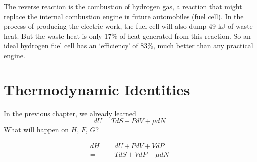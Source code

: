 The reverse reaction is the combustion of hydrogen gas, a reaction that might replace the internal combustion engine in future automobiles (fuel cell).
In the process of producing the electric work, the fuel cell will also dump 49 kJ of waste heat.
But the waste heat is only 17\% of heat generated from this reaction. So an ideal hydrogen fuel cell has an `efficiency' of 83\%, much better than any practical engine.




\section{Thermodynamic Identities}
In the previous chapter, we already learned
\begin{equation} dU = TdS - PdV + \mu dN \end{equation}
What will happen on $H$, $F$, $G$?

\begin{equation} 
\begin{split}
dH  = &  dU + PdV + VdP   \\
    = & TdS + VdP + \mu dN 
\end{split}
\end{equation}


